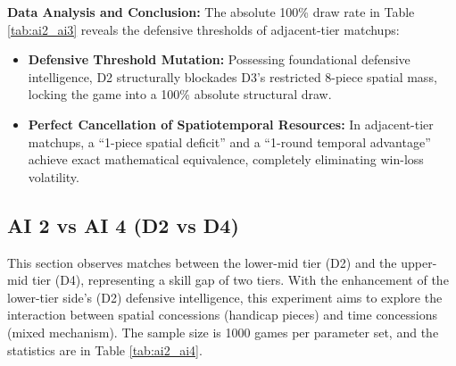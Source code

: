 \textbf{Data Analysis and Conclusion:} 
The absolute 100\% draw rate in Table \ref{tab:ai2_ai3} reveals the defensive thresholds of adjacent-tier matchups:
\begin{itemize}
    \item \textbf{Defensive Threshold Mutation:} Possessing foundational defensive intelligence, D2 structurally blockades D3's restricted 8-piece spatial mass, locking the game into a 100\% absolute structural draw.
    \item \textbf{Perfect Cancellation of Spatiotemporal Resources:} In adjacent-tier matchups, a ``1-piece spatial deficit'' and a ``1-round temporal advantage'' achieve exact mathematical equivalence, completely eliminating win-loss volatility.
\end{itemize}

\subsection{AI 2 vs AI 4 (D2 vs D4)}
\label{subsec:ai2_ai4}

This section observes matches between the lower-mid tier (D2) and the upper-mid tier (D4), representing a skill gap of two tiers. With the enhancement of the lower-tier side's (D2) defensive intelligence, this experiment aims to explore the interaction between spatial concessions (handicap pieces) and time concessions (mixed mechanism). The sample size is 1000 games per parameter set, and the statistics are in Table \ref{tab:ai2_ai4}.

\begin{table}[htbp]
    \centering
    \caption{AI 2 vs AI 4 Simulation Data Distribution (Sample Size=1000)}
    \label{tab:ai2_ai4}
\end{table}

